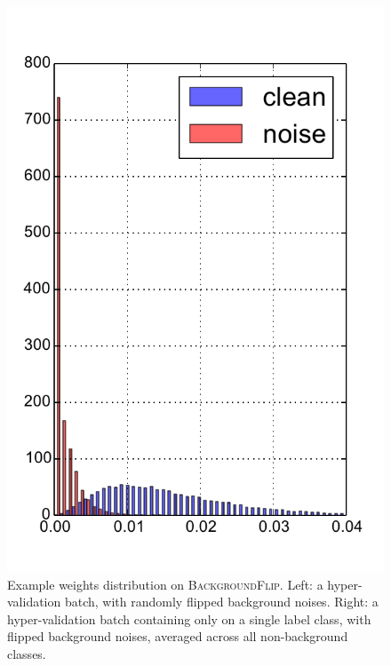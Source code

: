 \begin{figure}[t]
\includegraphics[width=0.45\columnwidth,trim={0cm 0 0cm 0},clip]{figures/condition.pdf}
\fi
\vspace{-0.1in}
\caption{Example weights distribution on \textsc{BackgroundFlip}. Left: a hyper-validation batch,
with randomly flipped background noises. Right: a hyper-validation batch containing only on a single
label class, with flipped background noises, averaged across all non-background classes.}
\label{fig:dist}
\end{figure}
